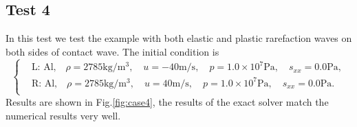 \documentclass{article}
\numberwithin{equation}{section}
\numberwithin{table}{section}
\begin{document}
\subsection{Test 4}
In this test we test the example with both elastic and plastic rarefaction waves on both sides of contact wave. The initial condition is
\begin{equation}
 \left\{ \begin{aligned}
	 &	 \text{L: Al,}\quad  \rho = 2785 \text{kg}/\text{m}^3, \quad  u = -40\text{m}/\text{s}, \quad  p = 1.0\times 10^7 \text{Pa}, \quad  s_{xx}=0.0 \text{Pa},\\
	 &	 \text{R: Al,}\quad  \rho = 2785 \text{kg}/\text{m}^3, \quad  u = 40\text{m}/\text{s}, \quad  p = 1.0\times 10^7\text{Pa}, \quad  s_{xx}=0.0 \text{Pa}.\\
   \end{aligned}
 \right.
\end{equation}
Results are shown in Fig.\ref{fig:case4},  the results of the exact solver match the numerical results very well.
\end{document}
